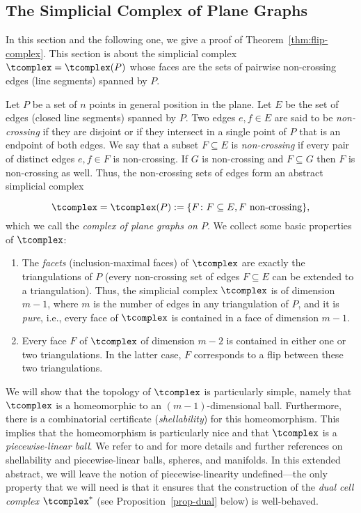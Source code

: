 \subsection{The Simplicial Complex of %
Plane Graphs} 
\label{sec:tcomplex}

In this section and the following one, we give a proof of Theorem~\ref{thm:flip-complex}.
This section is about the simplicial complex 
$\tcomplex=\tcomplex(P)$ whose faces are the sets of pairwise non-crossing edges (line segments) spanned by $P$.

Let $P$ be a set of $n$ points in general position in the plane.
Let $E$ be the set of edges (closed line segments) spanned by $P$.
Two edges $e,f\in E$ are said to be \emph{non-crossing} if they
are disjoint or if they intersect in a single point of $P$ that is an endpoint of both
edges. We say that a subset $F\subseteq E$ is \emph{non-crossing}
if every pair of distinct edges $e,f\in F$ is non-crossing. If $G$ is non-crossing and $F\subseteq G$ then $F$ is non-crossing as well. Thus, the non-crossing sets
of edges form an abstract simplicial complex

$$\tcomplex=\tcomplex(P):=\{F \colon F\subseteq E, F \textrm{ non-crossing}\},$$
which we call the \emph{complex of %
plane graphs on $P$}. 
We collect some basic properties of $\tcomplex$:

\begin{enumerate}
\item The \emph{facets} (inclusion-maximal faces) of $\tcomplex$ are exactly the triangulations of $P$
(every non-crossing set of edges $F\subseteq E$ can be extended to a 
triangulation). Thus, the simplicial complex $\tcomplex$ is of dimension $m-1$,
where $m$ is the number of edges in any triangulation of $P$, %
and it is \emph{pure}, i.e., every face of $\tcomplex$ is
contained in a face of dimension $m-1$.%
\item Every face $F$ of $\tcomplex$ of dimension $m-2$ is contained in either one or two triangulations. In the latter case, $F$ corresponds to a flip between these two triangulations.
\end{enumerate}

We will show that the topology of $\tcomplex$ is particularly simple, namely that $\tcomplex$ 
is a homeomorphic to an $(m-1)$-dimensional ball. Furthermore, there is a combinatorial certificate 
(\emph{shellability}) for this homeomorphism. This implies that the homeomorphism is particularly nice 
and that $\tcomplex$ is a \emph{piecewise-linear ball}. We refer to  \cite{Hudson:Piecewise-linear-topology-1969} and \cite[Appendix~4.7]{Bjorner:Oriented-matroids-1999} for more details and further references on shellability and piecewise-linear balls, spheres, and manifolds.
In this extended abstract, we will leave the notion of piecewise-linearity undefined---the only property that we will need is that it ensures that the construction of the \emph{dual cell complex} $\tcomplex^*$ (see Proposition~\ref{prop-dual} below) is well-behaved.

